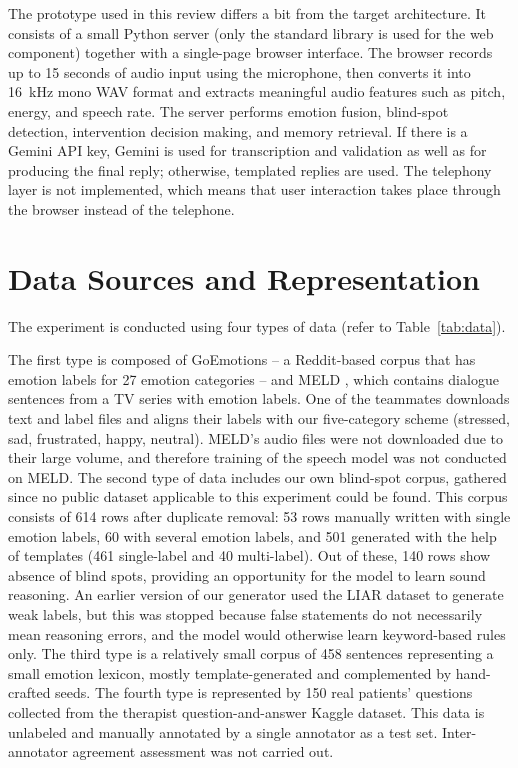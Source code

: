 \documentclass[conference]{IEEEtran}
\begin{document}
The prototype used in this review differs a bit from the target architecture. It consists of a small Python server (only the standard library is used for the web component) together with a single-page browser interface. The browser records up to 15 seconds of audio input using the microphone, then converts it into 16~kHz mono WAV format and extracts meaningful audio features such as pitch, energy, and speech rate. The server performs emotion fusion, blind-spot detection, intervention decision making, and memory retrieval. If there is a Gemini API key, Gemini is used for transcription and validation as well as for producing the final reply; otherwise, templated replies are used. The telephony layer is not implemented, which means that user interaction takes place through the browser instead of the telephone.

\section{Data Sources and Representation}
The experiment is conducted using four types of data (refer to Table~\ref{tab:data}).

The first type is composed of GoEmotions \cite{r24} -- a Reddit-based corpus that has emotion labels for 27 emotion categories -- and MELD \cite{r25}, which contains dialogue sentences from a TV series with emotion labels. One of the teammates downloads text and label files and aligns their labels with our five-category scheme (stressed, sad, frustrated, happy, neutral). MELD's audio files were not downloaded due to their large volume, and therefore training of the speech model was not conducted on MELD.
The second type of data includes our own blind-spot corpus, gathered since no public dataset applicable to this experiment could be found. This corpus consists of 614 rows after duplicate removal: 53 rows manually written with single emotion labels, 60 with several emotion labels, and 501 generated with the help of templates (461 single-label and 40 multi-label). Out of these, 140 rows show absence of blind spots, providing an opportunity for the model to learn sound reasoning. An earlier version of our generator used the LIAR \cite{r26} dataset to generate weak labels, but this was stopped because false statements do not necessarily mean reasoning errors, and the model would otherwise learn keyword-based rules only.
The third type is a relatively small corpus of 458 sentences representing a small emotion lexicon, mostly template-generated and complemented by hand-crafted seeds.
The fourth type is represented by 150 real patients' questions collected from the therapist question-and-answer Kaggle dataset. This data is unlabeled and manually annotated by a single annotator as a test set. Inter-annotator agreement assessment was not carried out.
\end{document}
